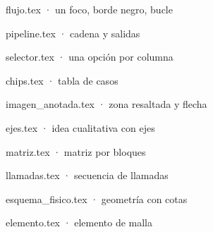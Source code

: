 \documentclass[aspectratio=169,11pt]{beamer}
\begin{document}
\begin{frame}{flujo.tex · un foco, borde negro, bucle}\centering\end{frame}
\begin{frame}{pipeline.tex · cadena y salidas}\centering\end{frame}
\begin{frame}{selector.tex · una opción por columna}\centering{}\end{frame}
\begin{frame}{chips.tex · tabla de casos}\centering
\end{frame}
\begin{frame}{imagen\_anotada.tex · zona resaltada y flecha}\centering\end{frame}
\begin{frame}{ejes.tex · idea cualitativa con ejes}\centering\end{frame}
\begin{frame}{matriz.tex · matriz por bloques}\centering\end{frame}
\begin{frame}{llamadas.tex · secuencia de llamadas}\centering\end{frame}
\begin{frame}{esquema\_fisico.tex · geometría con cotas}\centering\end{frame}
\begin{frame}{elemento.tex · elemento de malla}\centering\end{frame}
\end{document}
